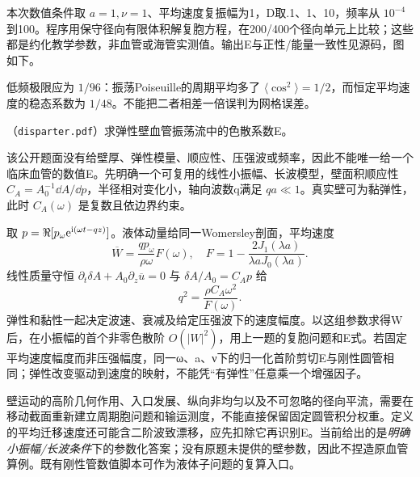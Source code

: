 \begin{solution}
本次数值条件取 $a=1,\nu=1$、平均速度复振幅为1，D取.1、1、10，频率从 $10^{-4}$ 到100。程序用保守径向有限体积解复胞方程，在200/400个径向单元上比较；这些都是约化教学参数，非血管或海管实测值。输出E与正性/能量一致性见源码，图如下。
\begin{center}\end{center}
低频极限应为 $1/96$：振荡Poiseuille的周期平均多了 $\langle\cos^2\rangle=1/2$，而恒定平均速度的稳态系数为 $1/48$。不能把二者相差一倍误判为网格误差。
\end{solution}

\begin{exercise}\label{task:fluid-disparter}
（\texttt{disparter.pdf}）求弹性壁血管振荡流中的色散系数E。
\end{exercise}
\begin{solution}
该公开题面没有给壁厚、弹性模量、顺应性、压强波或频率，因此不能唯一给一个临床血管的数值E。先明确一个可复用的线性小振幅、长波模型，壁面积顺应性 $C_A=A_0^{-1}\dd A/\dd p$，半径相对变化小，轴向波数q满足 $qa\ll1$。真实壁可为黏弹性，此时 $C_A(\omega)$ 是复数且依边界约束。

取 $p=\Re[p_\omega\mathrm e^{\mathrm i(\omega t-qz)}]$。液体动量给同一Womersley剖面，平均速度
\[
 \overline W=\frac{qp_\omega}{\rho\omega}F(\omega),\quad
 F=1-\frac{2J_1(\lambda a)}{\lambda aJ_0(\lambda a)}.
\]
线性质量守恒 $\partial_t\delta A+A_0\partial_z\overline u=0$ 与 $\delta A/A_0=C_Ap$ 给
\[
 q^2=\frac{\rho C_A\omega^2}{F(\omega)}.
\]
弹性和黏性一起决定波速、衰减及给定压强波下的速度幅度。以这组参数求得W后，在小振幅的首个非零色散阶 $O(|W|^2)$，用上一题的复胞问题和E式。若固定平均速度幅度而非压强幅度，同一ω、a、ν下的归一化首阶剪切E与刚性圆管相同；弹性改变驱动到速度的映射，不能凭“有弹性”任意乘一个增强因子。

壁运动的高阶几何作用、入口发展、纵向非均匀以及不可忽略的径向平流，需要在移动截面重新建立周期胞问题和输运测度，不能直接保留固定圆管积分权重。定义的平均迁移速度还可能含二阶波致漂移，应先扣除它再识别E。当前给出的是\emph{明确小振幅/长波条件}下的参数化答案；没有原题未提供的壁参数，因此不捏造原血管算例。既有刚性管数值脚本可作为液体子问题的复算入口。
\end{solution}

